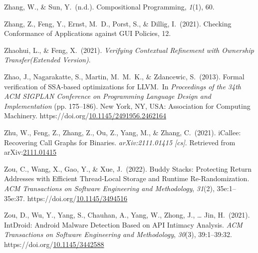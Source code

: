 \documentclass[12pt,twoside]{article}
\begin{document}
{\begin{thebibliography}{1079}
\mdbibitemlabel{}Zhang, W., \& Sun, Y.~(n.d.). Compositional Programming, \emph{1}(1), 60.%

\mdbibitemlabel{}Zhang, Z., Feng, Y., Ernst, M.~D., Porst, S., \& Dillig, I.~(2021). Checking Conformance of Applications against GUI Policies, 12.%

\mdbibitemlabel{}Zhaohui, L., \& Feng, X.~(2021). \emph{Verifying Contextual Refinement with Ownership Transfer(Extended Version)}.%

\mdbibitemlabel{}Zhao, J., Nagarakatte, S., Martin, M.~M.~K., \& Zdancewic, S.~(2013). Formal verification of SSA-based optimizations for LLVM.~In \emph{Proceedings of the 34th ACM SIGPLAN Conference on Programming Language Design and Implementation} (pp. 175–186). New York, NY, USA: Association for Computing Machinery. https://doi.org/\href{https://dx.doi.org/10.1145/2491956.2462164}{10.1145/2491956.2462164}%

\mdbibitemlabel{}Zhu, W., Feng, Z., Zhang, Z., Ou, Z., Yang, M., \& Zhang, C.~(2021). iCallee: Recovering Call Graphs for Binaries. \emph{arXiv:2111.01415 {}[cs]}. Retrieved from arXiv:\href{http://arxiv.org/abs/2111.01415}{2111.01415}%

\mdbibitemlabel{}Zou, C., Wang, X., Gao, Y., \& Xue, J.~(2022). Buddy Stacks: Protecting Return Addresses with Efficient Thread-Local Storage and Runtime Re-Randomization. \emph{ACM Transactions on Software Engineering and Methodology}, \emph{31}(2), 35e:1–35e:37. https://doi.org/\href{https://dx.doi.org/10.1145/3494516}{10.1145/3494516}%

\mdbibitemlabel{}Zou, D., Wu, Y., Yang, S., Chauhan, A., Yang, W., Zhong, J., … Jin, H.~(2021). IntDroid: Android Malware Detection Based on API Intimacy Analysis. \emph{ACM Transactions on Software Engineering and Methodology}, \emph{30}(3), 39:1–39:32. https://doi.org/\href{https://dx.doi.org/10.1145/3442588}{10.1145/3442588}%


\end{thebibliography}}
\end{document}

